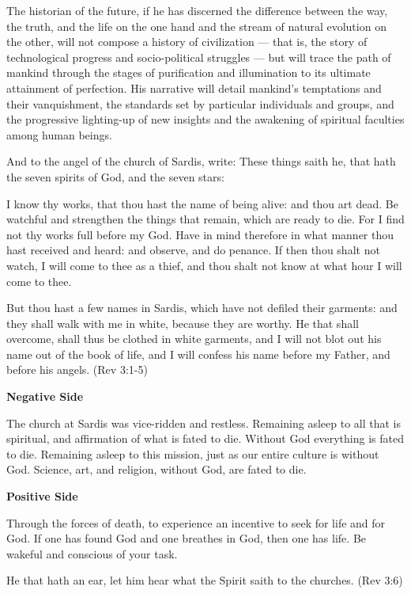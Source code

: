 \begin{quotex}
The historian of the future, if he has discerned the difference between the way, the truth, and the life on the one hand and the stream of natural evolution on the other, will not compose a history of civilization — that is, the story of technological progress and socio-political struggles — but will trace the path of mankind through the stages of purification and illumination to its ultimate attainment of perfection. His narrative will detail mankind's temptations and their vanquishment, the standards set by particular individuals and groups, and the progressive lighting-up of new insights and the awakening of spiritual faculties among human beings. 
\end{quotex}

And to the angel of the church of Sardis, write: These things saith he, that hath the seven spirits of God, and the seven stars:

I know thy works, that thou hast the name of being alive: and thou art dead. Be watchful and strengthen the things that remain, which are ready to die. For I find not thy works full before my God. Have in mind therefore in what manner thou hast received and heard: and observe, and do penance. If then thou shalt not watch, I will come to thee as a thief, and thou shalt not know at what hour I will come to thee.

But thou hast a few names in Sardis, which have not defiled their garments: and they shall walk with me in white, because they are worthy. He that shall overcome, shall thus be clothed in white garments, and I will not blot out his name out of the book of life, and I will confess his name before my Father, and before his angels. (Rev 3:1-5)

\textbf{Negative Side}

The church at Sardis was vice-ridden and restless. Remaining asleep to all that is spiritual, and affirmation of what is fated to die. Without God everything is fated to die. Remaining asleep to this mission, just as our entire culture is without God. Science, art, and religion, without God, are fated to die.

\textbf{Positive Side}

Through the forces of death, to experience an incentive to seek for life and for God. If one has found God and one breathes in God, then one has life. Be wakeful and conscious of your task.

He that hath an ear, let him hear what the Spirit saith to the churches. (Rev 3:6)

